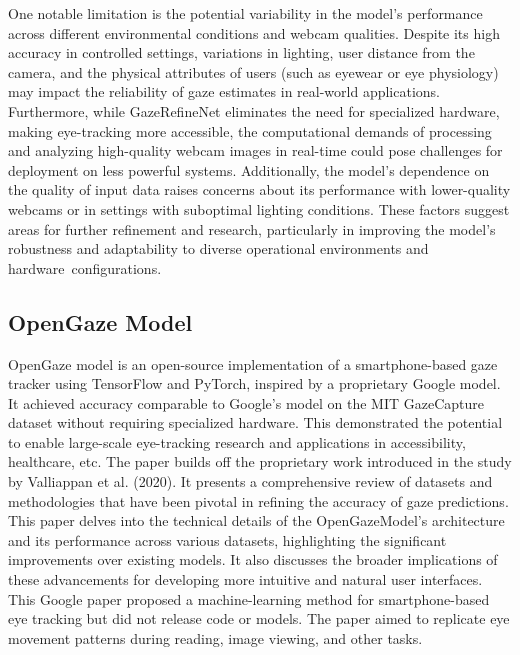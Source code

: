 \documentclass[conference]{IEEEtran}
\begin{document}
One notable limitation is the potential variability in the model's performance across different environmental conditions and webcam qualities. Despite its high accuracy in controlled settings, variations in lighting, user distance from the camera, and the physical attributes of users (such as eyewear or eye physiology) may impact the reliability of gaze estimates in real-world applications. Furthermore, while GazeRefineNet eliminates the need for specialized hardware, making eye-tracking more accessible, the computational demands of processing and analyzing high-quality webcam images in real-time could pose challenges for deployment on less powerful systems. Additionally, the model's dependence on the quality of input data raises concerns about its performance with lower-quality webcams or in settings with suboptimal lighting conditions. These factors suggest areas for further refinement and research, particularly in improving the model's robustness and adaptability to diverse operational environments and hardware configurations.

\vspace{\baselineskip}

\subsection{OpenGaze Model}
OpenGaze\cite{openGaze1}\cite{openGaze2} model is an open-source implementation of a smartphone-based gaze tracker using TensorFlow and PyTorch, inspired by a proprietary Google model.\cite{openGaze1} It achieved accuracy comparable to Google's model on the MIT GazeCapture\cite{gazecapture-1} dataset without requiring specialized hardware. This demonstrated the potential to enable large-scale eye-tracking research and applications in accessibility, healthcare, etc. 
The paper\cite{openGaze1} builds off the proprietary work introduced in the study by Valliappan et al. (2020).\cite{b6} It presents a comprehensive review of datasets and methodologies that have been pivotal in refining the accuracy of gaze predictions. This paper \cite{openGaze1} delves into the technical details of the OpenGazeModel's architecture and its performance across various datasets, highlighting the significant improvements over existing models. It also discusses the broader implications of these advancements for developing more intuitive and natural user interfaces. This Google paper proposed a machine-learning method for smartphone-based eye tracking but did not release code or models. The paper\cite{openGaze1} aimed to replicate eye movement patterns during reading, image viewing, and other tasks.
\end{document}
